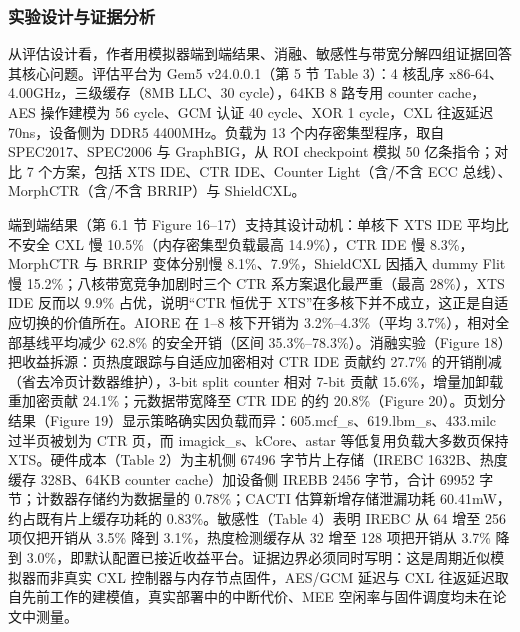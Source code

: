 \documentclass[11pt]{ctexart}
\begin{document}
\subsubsection{实验设计与证据分析}
从评估设计看，作者用模拟器端到端结果、消融、敏感性与带宽分解四组证据回答其核心问题。评估平台为 Gem5 v24.0.0.1（第 5 节 Table 3）：4 核乱序 x86-64、4.00GHz，三级缓存（8MB LLC、30 cycle），64KB 8 路专用 counter cache，AES 操作建模为 56 cycle、GCM 认证 40 cycle、XOR 1 cycle，CXL 往返延迟 70ns，设备侧为 DDR5 4400MHz。负载为 13 个内存密集型程序，取自 SPEC2017、SPEC2006 与 GraphBIG，从 ROI checkpoint 模拟 50 亿条指令；对比 7 个方案，包括 XTS IDE、CTR IDE、Counter Light（含/不含 ECC 总线）、MorphCTR（含/不含 BRRIP）与 ShieldCXL。\par
端到端结果（第 6.1 节 Figure 16--17）支持其设计动机：单核下 XTS IDE 平均比不安全 CXL 慢 10.5\%（内存密集型负载最高 14.9\%），CTR IDE 慢 8.3\%，MorphCTR 与 BRRIP 变体分别慢 8.1\%、7.9\%，ShieldCXL 因插入 dummy Flit 慢 15.2\%；八核带宽竞争加剧时三个 CTR 系方案退化最严重（最高 28\%），XTS IDE 反而以 9.9\% 占优，说明“CTR 恒优于 XTS”在多核下并不成立，这正是自适应切换的价值所在。AIORE 在 1--8 核下开销为 3.2\%--4.3\%（平均 3.7\%），相对全部基线平均减少 62.8\% 的安全开销（区间 35.3\%--78.3\%）。消融实验（Figure 18）把收益拆源：页热度跟踪与自适应加密相对 CTR IDE 贡献约 27.7\% 的开销削减（省去冷页计数器维护），3-bit split counter 相对 7-bit 贡献 15.6\%，增量加卸载重加密贡献 24.1\%；元数据带宽降至 CTR IDE 的约 20.8\%（Figure 20）。页划分结果（Figure 19）显示策略确实因负载而异：605.mcf\_s、619.lbm\_s、433.milc 过半页被划为 CTR 页，而 imagick\_s、kCore、astar 等低复用负载大多数页保持 XTS。硬件成本（Table 2）为主机侧 67496 字节片上存储（IREBC 1632B、热度缓存 328B、64KB counter cache）加设备侧 IREBB 2456 字节，合计 69952 字节；计数器存储约为数据量的 0.78\%；CACTI 估算新增存储泄漏功耗 60.41mW，约占既有片上缓存功耗的 0.83\%。敏感性（Table 4）表明 IREBC 从 64 增至 256 项仅把开销从 3.5\% 降到 3.1\%，热度检测缓存从 32 增至 128 项把开销从 3.7\% 降到 3.0\%，即默认配置已接近收益平台。证据边界必须同时写明：这是周期近似模拟器而非真实 CXL 控制器与内存节点固件，AES/GCM 延迟与 CXL 往返延迟取自先前工作的建模值，真实部署中的中断代价、MEE 空闲率与固件调度均未在论文中测量。\par
\end{document}
